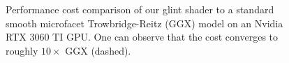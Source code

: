 \begin{figure}[!ht]
    \centering
    \def\axisdefaultwidth{1\textwidth}
    \def\axisdefaultheight{0.3\textwidth}
    \resizebox{1\linewidth}{!}{}
    \caption{Performance cost comparison of our glint shader to a standard smooth microfacet Trowbridge-Reitz (GGX) model on an Nvidia RTX 3060 TI GPU. One can observe that the cost converges to roughly $10\times$ GGX (dashed).\label{fig:performance}}
\end{figure}